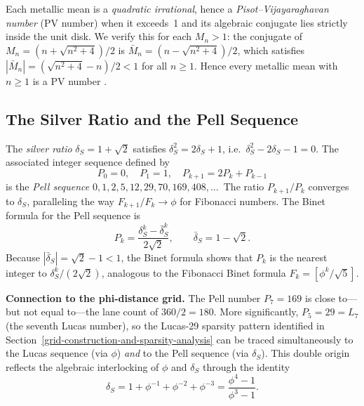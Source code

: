 Each metallic mean is a \emph{quadratic irrational},
hence a \emph{Pisot--Vijayaraghavan number} (PV
number) when it exceeds~1 and its algebraic
conjugate lies strictly inside the unit disk.
We verify this for each $M_n > 1$: the conjugate
of $M_n = (n+\sqrt{n^2+4})/2$ is
$\bar{M}_n = (n - \sqrt{n^2+4})/2$, which satisfies
$|\bar{M}_n| = (\sqrt{n^2+4}-n)/2 < 1$ for all
$n \geq 1$.  Hence every metallic mean with
$n \geq 1$ is a PV number
\cite{cassels_diophantine}.

\subsection{The Silver Ratio and the Pell Sequence}
\label{subsec:silver-ratio}

The \emph{silver ratio} $\delta_S = 1 + \sqrt{2}$
satisfies $\delta_S^2 = 2\delta_S + 1$, i.e.\
$\delta_S^2 - 2\delta_S - 1 = 0$.  The associated
integer sequence defined by
\begin{equation}\label{eq:pell-recurrence}
  P_0 = 0,\quad P_1 = 1,\quad P_{k+1} = 2P_k + P_{k-1}
\end{equation}
is the \emph{Pell sequence}
$0, 1, 2, 5, 12, 29, 70, 169, 408, \ldots$\
The ratio $P_{k+1}/P_k$ converges to $\delta_S$,
paralleling the way $F_{k+1}/F_k \to \phi$
for Fibonacci numbers.  The Binet formula
for the Pell sequence is
\begin{equation}\label{eq:pell-binet}
  P_k = \frac{\delta_S^k - \bar{\delta}_S^k}{2\sqrt{2}},
  \qquad \bar{\delta}_S = 1 - \sqrt{2}.
\end{equation}
Because $|\bar{\delta}_S| = \sqrt{2}-1 < 1$,
the Binet formula shows that $P_k$ is the nearest
integer to $\delta_S^k/(2\sqrt{2})$, analogous
to the Fibonacci Binet formula
$F_k = [\phi^k/\sqrt{5}]$.

\textbf{Connection to the phi-distance grid.}
The Pell number $P_7 = 169$ is close to---but not
equal to---the lane count of $360/2 = 180$.
More significantly, $P_5 = 29 = L_7$ (the seventh
Lucas number), so the Lucas-29 sparsity pattern
identified in Section~\ref{grid-construction-and-sparsity-analysis}
can be traced simultaneously to the Lucas sequence
(via $\phi$) \emph{and} to the Pell sequence
(via $\delta_S$).  This double origin reflects the
algebraic interlocking of $\phi$ and $\delta_S$
through the identity
\begin{equation}\label{eq:phi-silver-identity}
  \delta_S = 1 + \phi^{-1} + \phi^{-2} + \phi^{-3}
           = \frac{\phi^4 - 1}{\phi^3 - 1}.
\end{equation}

